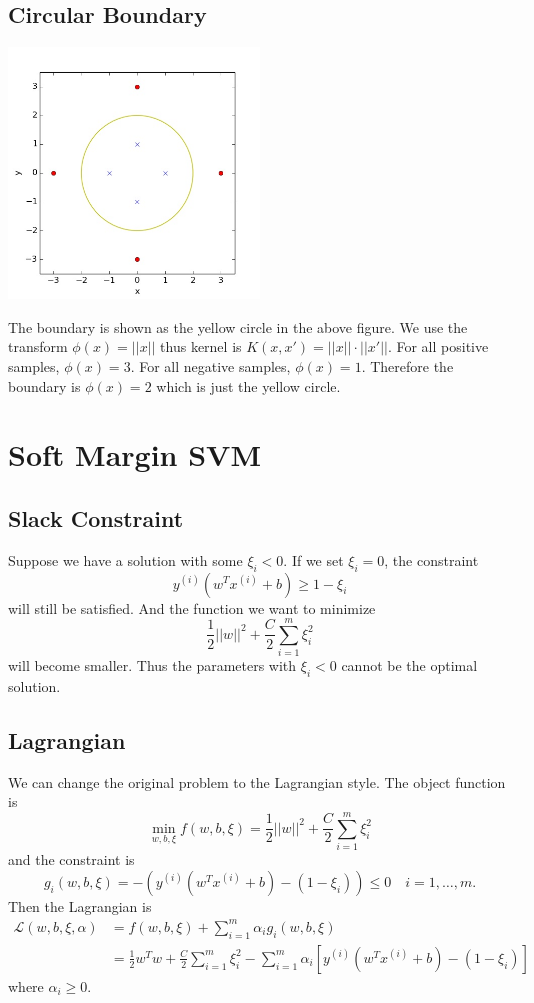 \documentclass{article}
\begin{document}
\subsection{Circular Boundary}
\begin{center}
\includegraphics[width=0.5\textwidth]{../result/circular_boundary.jpg}
\end{center}
The boundary is shown as the yellow circle in the above figure. We use the transform $\phi(x)=||x||$ thus kernel is $K(x,x')=||x||\cdot||x'||$. For all positive samples, $\phi(x)=3$. For all negative samples, $\phi(x)=1$. Therefore the boundary is $\phi(x)=2$ which is just the yellow circle.

\section{Soft Margin SVM}

\subsection{Slack Constraint}
Suppose we have a solution with some $\xi_i<0$. If we set $\xi_i=0$, the constraint $$y^{(i)}(w^Tx^{(i)}+b)\ge1-\xi_i$$ will still be satisfied. And the function we want to minimize $$\frac{1}{2}||w||^2+\frac{C}{2}\sum_{i=1}^m\xi_i^2$$ will become smaller. Thus the parameters with $\xi_i<0$ cannot be the optimal solution.

\subsection{Lagrangian}
We can change the original problem to the Lagrangian style. The object function is $$\min_{w,b,\xi}f(w,b,\xi)= \frac{1}{2}||w||^2+\frac{C}{2}\sum_{i=1}^m\xi_i^2$$ and the constraint is $$g_i(w,b,\xi)=-(y^{(i)}(w^Tx^{(i)}+b)-(1-\xi_i)) \le0\quad i=1,\ldots,m.$$ Then the Lagrangian is
\begin{align*}
\mathcal{L}(w,b,\xi,\alpha)&=f(w,b,\xi)+ \sum_{i=1}^m\alpha_ig_i(w,b,\xi) \\
&=\frac{1}{2}w^Tw+\frac{C}{2}\sum_{i=1}^m\xi_i^2 -\sum_{i=1}^m\alpha_i[y^{(i)}(w^Tx^{(i)}+b)-(1-\xi_i)]
\end{align*}
where $\alpha_i\ge0$.
\end{document}
